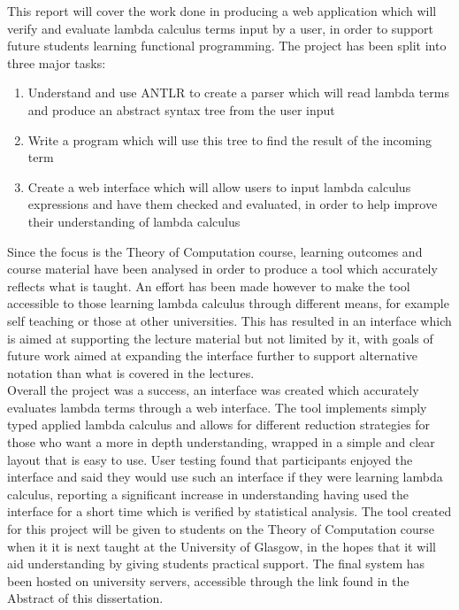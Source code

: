 \documentclass[a4paper,11pt]{report}
\begin{document}
This report will cover the work done in producing a web application which will verify and evaluate lambda calculus terms input by a user, in order to support future students learning functional programming. The project has been split into three major tasks:

\begin{enumerate}
	\item Understand and use ANTLR to create a parser which will read lambda terms and produce an abstract syntax tree from the user input
	\item Write a program which will use this tree to find the result of the incoming term
	\item Create a web interface which will allow users to input lambda calculus expressions and have them checked and evaluated, in order to help improve their understanding of lambda calculus
\end{enumerate}

Since the focus is the Theory of Computation course, learning outcomes and course material have been analysed in order to produce a tool which accurately reflects what is taught. An effort has been made however to make the tool accessible to those learning lambda calculus through different means, for example self teaching or those at other universities. This has resulted in an interface which is aimed at supporting the lecture material but not limited by it, with goals of future work aimed at expanding the interface further to support alternative notation than what is covered in the lectures.\\

Overall the project was a success, an interface was created which accurately evaluates lambda terms through a web interface. The tool implements simply typed applied lambda calculus and allows for different reduction strategies for those who want a more in depth understanding, wrapped in a simple and clear layout that is easy to use. User testing found that participants enjoyed the interface and said they would use such an interface if they were learning lambda calculus, reporting a significant increase in understanding having used the interface for a short time which is verified by statistical analysis. The tool created for this project will be given to students on the Theory of Computation course when it it is next taught at the University of Glasgow, in the hopes that it will aid understanding by giving students practical support. The final system has been hosted on university servers, accessible through the link found in the Abstract of this dissertation.\\
\end{document}
